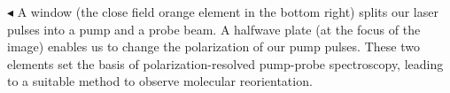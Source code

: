 
\thispagestyle{empty}


\clearpage



\begin{savequote}[75mm]
$\blacktriangleleft$ A  window (the close field orange element in the bottom right) splits our laser pulses into a pump and a probe beam. A halfwave plate (at the focus of the image) enables us to change the polarization of our pump pulses. These two elements set the basis of polarization-resolved pump-probe spectroscopy, leading to a suitable method to observe molecular reorientation.
\end{savequote}




